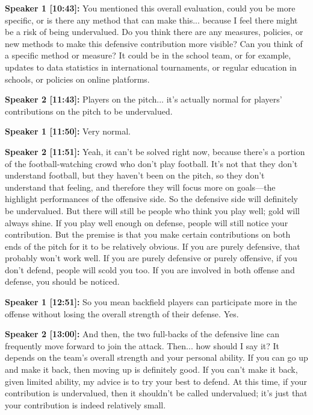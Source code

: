 \documentclass[11pt,a4paper]{article}
\begin{document}
\begin{linenumbers}
\vspace{0.5em}
\noindent \textbf{Speaker 1 [10:43]:} You mentioned this overall evaluation, could you be more specific, or is there any method that can make this... because I feel there might be a risk of being undervalued. Do you think there are any measures, policies, or new methods to make this defensive contribution more visible? Can you think of a specific method or measure? It could be in the school team, or for example, updates to data statistics in international tournaments, or regular education in schools, or policies on online platforms.

\vspace{0.5em}
\noindent \textbf{Speaker 2 [11:43]:} Players on the pitch... it's actually normal for players' contributions on the pitch to be undervalued.

\vspace{0.5em}
\noindent \textbf{Speaker 1 [11:50]:} Very normal.

\vspace{0.5em}
\noindent \textbf{Speaker 2 [11:51]:} Yeah, it can't be solved right now, because there's a portion of the football-watching crowd who don't play football. It's not that they don't understand football, but they haven't been on the pitch, so they don't understand that feeling, and therefore they will focus more on goals---the highlight performances of the offensive side. So the defensive side will definitely be undervalued. But there will still be people who think you play well; gold will always shine. If you play well enough on defense, people will still notice your contribution. But the premise is that you make certain contributions on both ends of the pitch for it to be relatively obvious. If you are purely defensive, that probably won't work well. If you are purely defensive or purely offensive, if you don't defend, people will scold you too. If you are involved in both offense and defense, you should be noticed.

\vspace{0.5em}
\noindent \textbf{Speaker 1 [12:51]:} So you mean backfield players can participate more in the offense without losing the overall strength of their defense. Yes.

\vspace{0.5em}
\noindent \textbf{Speaker 2 [13:00]:} And then, the two full-backs of the defensive line can frequently move forward to join the attack. Then... how should I say it? It depends on the team's overall strength and your personal ability. If you can go up and make it back, then moving up is definitely good. If you can't make it back, given limited ability, my advice is to try your best to defend. At this time, if your contribution is undervalued, then it shouldn't be called undervalued; it's just that your contribution is indeed relatively small.


\end{linenumbers}
\end{document}
